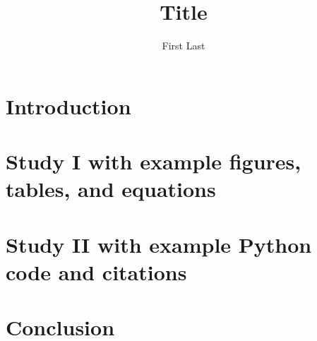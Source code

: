 \documentclass[11pt]{report}
\begin{document}
\title{Title}

\author{First Last}



\begin{preface}
  

  

  {
  \hypersetup{hidelinks} %
  \tableofcontents
  \listoftables
  \listoffigures
  }

  
\end{preface}

\chapter{Introduction} \label{ch:introduction}


\chapter{Study I with example figures, tables, and equations} \label{ch:study-i}


\chapter{Study II with example Python code and citations} \label{ch:study-ii}


\chapter{Conclusion} \label{ch:conclusion}


\cleardoublepage
{}
{}
\begin{singlespace}

  \setlength{}

  \raggedright
  \printbibliography[title=Bibliography]
\end{singlespace}
\end{document}
